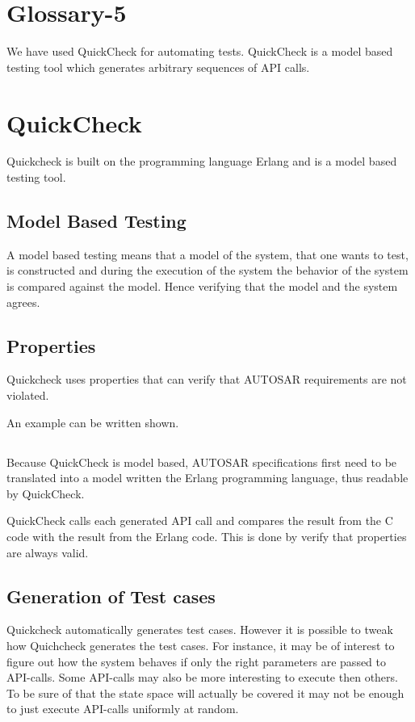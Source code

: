 \documentclass[a4paper]{article}
\begin{document}
\section{Glossary-5}
We have used QuickCheck for automating tests. QuickCheck is a model
based testing tool which generates arbitrary sequences of API calls.


\section{QuickCheck}
Quickcheck is built on the programming language Erlang and is a model based
testing tool.

\subsection{Model Based Testing}
A model based testing means that a model of the system, that one wants to test,
is constructed and during the execution of the system the behavior of the system is
compared against the model. Hence verifying that the model and the system agrees.

\subsection{Properties}
Quickcheck uses properties that can verify that AUTOSAR requirements are not
violated.

An example can be written shown.

\subsection{}
Because QuickCheck is model based, AUTOSAR specifications first need
to be translated into a model written the Erlang programming language,
thus readable by QuickCheck.

QuickCheck calls each generated API call and compares the result from
the C code with the result from the Erlang code. This is done by verify that
properties are always valid.

\subsection{Generation of Test cases}
Quickcheck automatically generates test cases. However it is possible to tweak
how Quichcheck generates the test cases. For instance, it may be of interest to
figure out how the system behaves if only the right parameters are passed to
API-calls. Some API-calls may also be more interesting to execute then others.
To be sure of that the state space will actually be covered it may not be enough
to just execute API-calls uniformly at random.
\end{document}
